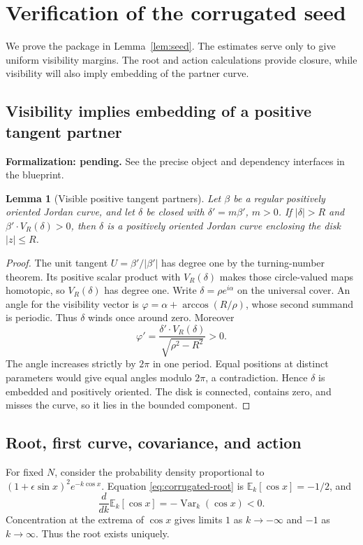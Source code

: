\documentclass[11pt]{amsart}
\newtheorem{lemma}[theorem]{Lemma}
\theoremstyle{definition}
\theoremstyle{remark}
\numberwithin{equation}{section}
\begin{document}
\section{Verification of the corrugated seed}\label{app:seed-estimates}
We prove the package in Lemma~\ref{lem:seed}. The estimates serve only
to give uniform visibility margins. The root and action calculations
provide closure, while visibility will also imply embedding of the
partner curve.

\subsection{Visibility implies embedding of a positive tangent partner}
\par\noindent\textbf{Formalization: pending.} See the precise object and dependency interfaces in the blueprint.\par
\begin{lemma}[Visible positive tangent partners]\label{lem:visible-partner}
Let $\beta$ be a regular positively oriented Jordan curve, and let
$\delta$ be closed with $\delta'=m\beta'$, $m>0$. If $|\delta|>R$
and $\beta'\cdot V_R(\delta)>0$, then $\delta$ is a positively oriented
Jordan curve enclosing the disk $|z|\le R$.
\end{lemma}
\begin{proof}
The unit tangent $U=\beta'/|\beta'|$ has degree one by the turning-number
theorem. Its positive scalar product with $V_R(\delta)$ makes those
circle-valued maps homotopic, so $V_R(\delta)$ has degree one.
Write $\delta=\rho e^{i\alpha}$ on the universal cover. An angle for the
visibility vector is $\varphi=\alpha+\arccos(R/\rho)$, whose second
summand is periodic. Thus $\delta$ winds once around zero. Moreover
\begin{equation}\label{eq:visibility-embedding}
 \varphi'=\frac{\delta'\cdot V_R(\delta)}{\sqrt{\rho^2-R^2}}>0.
\end{equation}
The angle increases strictly by $2\pi$ in one period. Equal positions at
distinct parameters would give equal angles modulo $2\pi$, a contradiction.
Hence $\delta$ is embedded and positively oriented. The disk is connected,
contains zero, and misses the curve, so it lies in the bounded component.
\end{proof}

\subsection{Root, first curve, covariance, and action}
For fixed $N$, consider the probability density proportional to
$(1+\epsilon\sin x)^2e^{-k\cos x}$. Equation
\eqref{eq:corrugated-root} is $\mathbb E_k[\cos x]=-1/2$, and
\[
 \frac d{dk}\mathbb E_k[\cos x]=-\operatorname{Var}_k(\cos x)<0.
\]
Concentration at the extrema of $\cos x$ gives limits $1$ as
$k\to-\infty$ and $-1$ as $k\to\infty$. Thus the root exists uniquely.
\end{document}
